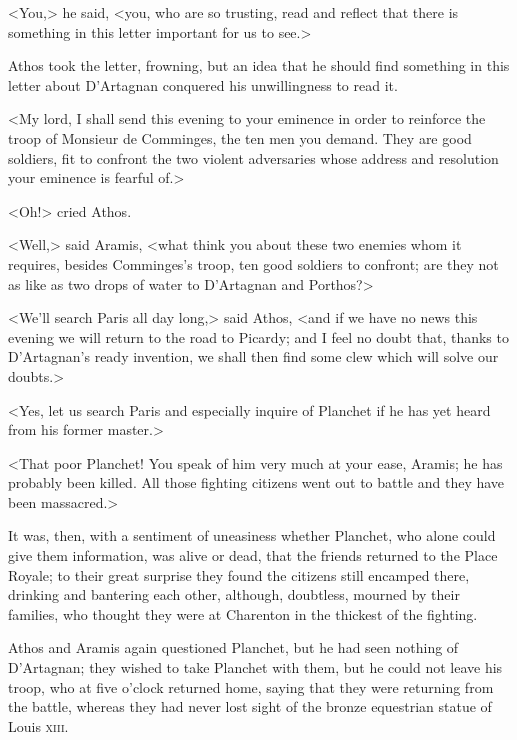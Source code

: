 <You,> he said, <you, who are so trusting, read and reflect that there is something in this letter important for us to see.>

Athos took the letter, frowning, but an idea that he should find something in this letter about D'Artagnan conquered his unwillingness to read it.

<My lord, I shall send this evening to your eminence in order to reinforce the troop of Monsieur de Comminges, the ten men you demand. They are good soldiers, fit to confront the two violent adversaries whose address and resolution your eminence is fearful of.>

<Oh!> cried Athos.

<Well,> said Aramis, <what think you about these two enemies whom it requires, besides Comminges's troop, ten good soldiers to confront; are they not as like as two drops of water to D'Artagnan and Porthos?>

<We'll search Paris all day long,> said Athos, <and if we have no news this evening we will return to the road to Picardy; and I feel no doubt that, thanks to D'Artagnan's ready invention, we shall then find some clew which will solve our doubts.>

<Yes, let us search Paris and especially inquire of Planchet if he has yet heard from his former master.>

<That poor Planchet! You speak of him very much at your ease, Aramis; he has probably been killed. All those fighting citizens went out to battle and they have been massacred.>

It was, then, with a sentiment of uneasiness whether Planchet, who alone could give them information, was alive or dead, that the friends returned to the Place Royale; to their great surprise they found the citizens still encamped there, drinking and bantering each other, although, doubtless, mourned by their families, who thought they were at Charenton in the thickest of the fighting.

Athos and Aramis again questioned Planchet, but he had seen nothing of D'Artagnan; they wished to take Planchet with them, but he could not leave his troop, who at five o'clock returned home, saying that they were returning from the battle, whereas they had never lost sight of the bronze equestrian statue of Louis \textsc{xiii}.